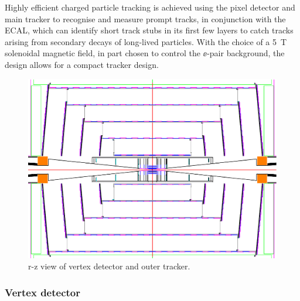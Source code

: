 Highly efficient charged particle tracking is achieved using the pixel detector
and main tracker to recognise and measure prompt tracks, in conjunction with the ECAL, which can
identify short track stubs in its first few layers 
to catch tracks arising from secondary decays of long-lived particles. With
the choice of a 5~T solenoidal magnetic field, in part chosen to control the $\ee$-pair
background, the design allows for a compact tracker design. 

\begin{figure}[tb]
 \begin{center}
 \includegraphics[width=0.9\hsize]{chapters/figures/vxdtrk.pdf}
\caption{r-z view of vertex detector and outer tracker.
\label{fig_vxdtrk}}
 \end{center}
 \vspace{-0.7cm}
 \end{figure}

\subsubsection{Vertex detector}

